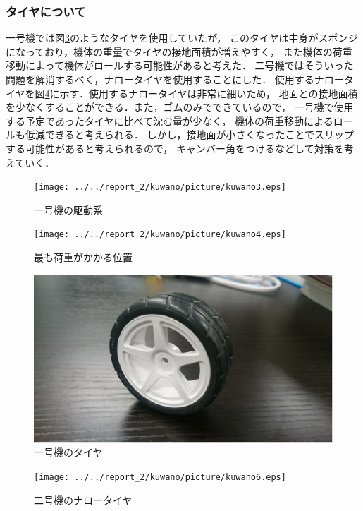 \documentclass[11pt,a4]{jsarticle}
\begin{document}
\subsubsection{タイヤについて}
一号機では図\ref{kuwano5}のようなタイヤを使用していたが，
このタイヤは中身がスポンジになっており，機体の重量でタイヤの接地面積が増えやすく，
また機体の荷重移動によって機体がロールする可能性があると考えた．
二号機ではそういった問題を解消するべく，ナロータイヤを使用することにした．
使用するナロータイヤを図\ref{kuwano6}に示す．使用するナロータイヤは非常に細いため，
地面との接地面積を少なくすることができる．また，ゴムのみでできているので，
一号機で使用する予定であったタイヤに比べて沈む量が少なく，
機体の荷重移動によるロールも低減できると考えられる．
しかし，接地面が小さくなったことでスリップする可能性があると考えられるので，
キャンバー角をつけるなどして対策を考えていく．

\begin{figure}[H]
  \begin{center}
    \texttt{[image: ../../report\_2/kuwano/picture/kuwano3.eps]}
    \caption{一号機の駆動系}
    \label{kuwano3}
  \end{center}
\end{figure}

\begin{figure}[H]
  \begin{center}
    \texttt{[image: ../../report\_2/kuwano/picture/kuwano4.eps]}
    \caption{最も荷重がかかる位置}
    \label{kuwano4}
  \end{center}
\end{figure}

\begin{figure}[H]
  \begin{center}
    \includegraphics[width=0.55\hsize]{../../report_2/kuwano/picture/kuwano5.eps}
    \caption{一号機のタイヤ}
    \label{kuwano5}
  \end{center}
\end{figure}

\begin{figure}[H]
  \begin{center}
    \texttt{[image: ../../report\_2/kuwano/picture/kuwano6.eps]}
    \caption{二号機のナロータイヤ}
    \label{kuwano6}
  \end{center}
\end{figure}
\end{document}
